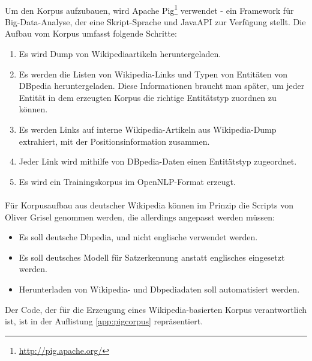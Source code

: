 \paragraph{}
Um den Korpus aufzubauen, wird Apache Pig\footnote{\url{http://pig.apache.org/}} verwendet - ein Framework für Big-Data-Analyse, der eine Skript-Sprache und JavaAPI zur Verfügung stellt. Die Aufbau vom Korpus umfasst folgende Schritte:
\begin{enumerate}
\item Es wird Dump von Wikipediaartikeln heruntergeladen.
\item Es werden die Listen von Wikipedia-Links und Typen von Entitäten von DBpedia heruntergeladen. Diese Informationen braucht man später, um jeder Entität in dem erzeugten Korpus die richtige Entitätstyp zuordnen zu können.
\item Es werden Links auf interne Wikipedia-Artikeln aus Wikipedia-Dump extrahiert, mit der Positionsinformation zusammen.
\item Jeder Link wird mithilfe von DBpedia-Daten einen Entitätstyp zugeordnet.
\item Es wird ein Trainingskorpus im OpenNLP-Format erzeugt.
\end{enumerate}

\paragraph{} 
Für Korpusaufbau aus deutscher Wikipedia können im Prinzip die Scripts von Oliver Grisel genommen werden, die allerdings angepasst werden müssen:
\begin{itemize}
\item Es soll deutsche Dbpedia, und nicht englische verwendet werden.
\item Es soll deutsches Modell für Satzerkennung anstatt englisches eingesetzt werden.
\item Herunterladen von Wikipedia- und Dbpediadaten soll automatisiert werden.
\end{itemize}

Der Code, der für die Erzeugung eines Wikipedia-basierten Korpus verantwortlich ist, ist in der Auflistung \ref{app:pigcorpus} repräsentiert.

